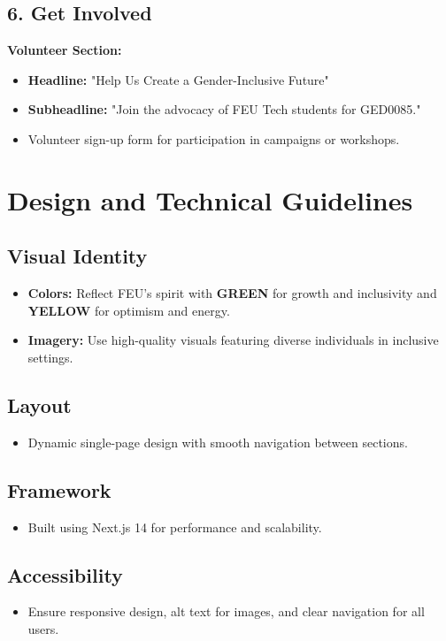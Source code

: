 \documentclass{article}
\begin{document}
\subsection*{6. Get Involved}
\textbf{Volunteer Section:}
\begin{itemize}
    \item \textbf{Headline:} "Help Us Create a Gender-Inclusive Future"
    \item \textbf{Subheadline:} "Join the advocacy of FEU Tech students for GED0085."
    \item Volunteer sign-up form for participation in campaigns or workshops.
\end{itemize}

\section*{Design and Technical Guidelines}
\subsection*{Visual Identity}
\begin{itemize}[leftmargin=*]
    \item \textbf{Colors:} Reflect FEU's spirit with {\color{feugreen}\textbf{GREEN}} for growth and inclusivity and {\color{feuyellow}\textbf{YELLOW}} for optimism and energy.
    \item \textbf{Imagery:} Use high-quality visuals featuring diverse individuals in inclusive settings.
\end{itemize}

\subsection*{Layout}
\begin{itemize}
    \item Dynamic single-page design with smooth navigation between sections.
\end{itemize}

\subsection*{Framework}
\begin{itemize}
    \item Built using Next.js 14 for performance and scalability.
\end{itemize}

\subsection*{Accessibility}
\begin{itemize}
    \item Ensure responsive design, alt text for images, and clear navigation for all users.
\end{itemize}
\end{document}
